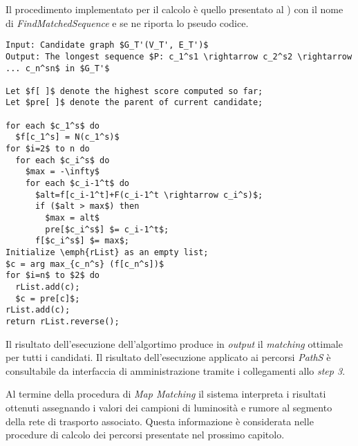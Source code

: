 Il procedimento implementato per il calcolo è quello presentato al \cite[paragrafo 5.4]{stmapmatching}) con il nome di \emph{FindMatchedSequence} e se ne riporta lo pseudo codice.
\begin{lstlisting}[mathescape]
Input: Candidate graph $G_T'(V_T', E_T')$
Output: The longest sequence $P: c_1^s1 \rightarrow c_2^s2 \rightarrow ... c_n^sn$ in $G_T'$

Let $f[ ]$ denote the highest score computed so far;
Let $pre[ ]$ denote the parent of current candidate;

for each $c_1^s$ do
  $f[c_1^s] = N(c_1^s)$
for $i=2$ to n do
  for each $c_i^s$ do
    $max = -\infty$
    for each $c_i-1^t$ do
      $alt=f[c_i-1^t]+F(c_i-1^t \rightarrow c_i^s)$;
      if ($alt > max$) then
        $max = alt$
        pre[$c_i^s$] $= c_i-1^t$;
      f[$c_i^s$] $= max$;
Initialize \emph{rList} as an empty list;
$c = arg max_{c_n^s} (f[c_n^s])$
for $i=n$ to $2$ do
  rList.add(c);
  $c = pre[c]$;
rList.add(c);
return rList.reverse();
\end{lstlisting}
Il risultato dell'esecuzione dell'algortimo produce in \emph{output} il \emph{matching} ottimale per tutti i candidati. Il risultato dell'esecuzione applicato ai percorsi \emph{PathS} è consultabile da interfaccia di amministrazione tramite i collegamenti allo \emph{step 3}.

Al termine della procedura di \emph{Map Matching} il sistema interpreta i risultati ottenuti assegnando i valori dei campioni di luminosità e rumore al segmento della rete di trasporto associato. Questa informazione è considerata nelle procedure di calcolo dei percorsi presentate nel prossimo capitolo.
